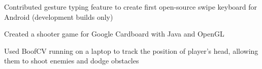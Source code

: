 \documentclass[]{deedy-resume-openfont}
\begin{document}
\begin{minipage}[t]{0.67\textwidth}
\begin{tightemize}
\item Contributed gesture typing feature to create first open-source swipe keyboard for Android (development builds only)
\end{tightemize}
\sectionsep

\begin{tightemize}
\item Created a shooter game for Google Cardboard with Java and OpenGL 
\item Used BoofCV running on a laptop to track the position of player’s head, allowing them to shoot enemies and dodge obstacles
\end{tightemize}
\sectionsep

\end{minipage} 
\end{document}
